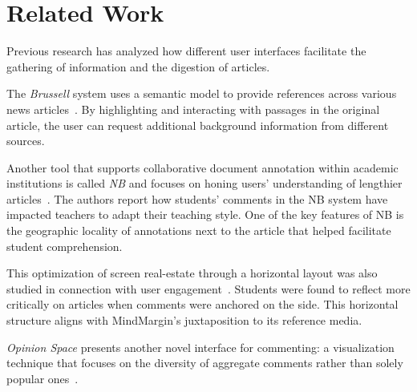 \section{Related Work}

Previous research has analyzed how different user interfaces facilitate the gathering of information and the digestion of articles. 

The \textit{Brussell} system uses a semantic model to provide references across various news articles~\cite{NewsInterfaces}. By highlighting and interacting with passages in the original article, the user can request additional background information from different sources. 

Another tool that supports collaborative document annotation within academic institutions is called \textit{NB} and focuses on honing users' understanding of lengthier articles~\cite{NB}. The authors report how students' comments in the NB system have impacted teachers to adapt their teaching style. One of the key features of NB is the geographic locality of annotations next to the article that helped facilitate student comprehension. %

This optimization of screen real-estate through a horizontal layout was also studied in connection with user engagement~\cite{AnnotationsStudents}. Students were found to reflect more critically on articles when comments were anchored on the side. This horizontal structure aligns with MindMargin's juxtaposition to its reference media. %

\textit{Opinion Space} presents another novel interface for commenting: a visualization technique that focuses on the diversity of aggregate comments rather than solely popular ones~\cite{OpinionSpace}. 



